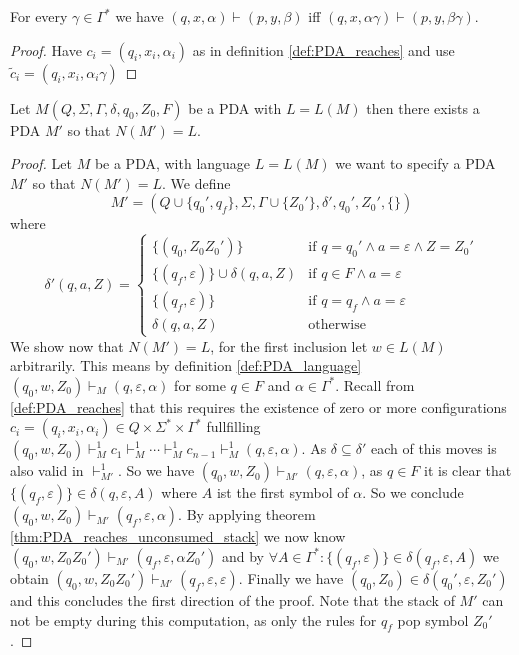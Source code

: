 \begin{theorem}\label{thm:PDA_reaches_unconsumed_stack}
  For   every $\gamma\in\Gamma^*$ we have $(q,x,\alpha)\vdash(p,y,\beta)$ iff
  $(q,x,\alpha\gamma)\vdash(p,y,\beta\gamma)$.
\end{theorem}
\begin{proof}
  Have $c_i = (q_i,x_i,\alpha_i)$ as in definition \ref{def:PDA_reaches} and use
  $\tilde{c}_i = (q_i,x_i,\alpha_i\gamma)$
\end{proof}
\begin{theorem}\label{thm:PDA_empty_stack_of_final_state}
  Let $M(Q,\Sigma,\Gamma,\delta,q_0,Z_0,F)$ be a PDA with $L=L(M)$ then there exists a PDA $M'$ so that $N(M')=L.$
\end{theorem}
\begin{proof}
  Let $M$ be a PDA, with language $L=L(M)$ we want to specify a PDA $M'$ so that
  $N(M')=L$. We define
  \[
  M' =(Q\cup\{q_0',q_f\},\Sigma,\Gamma\cup\{Z_0'\},\delta',q_0',Z_0',\{\})
  \]
  where
  \[
  \delta'(q,a,Z) =
  \begin{cases}
    \{(q_0,Z_0Z_0')\} & \text{if } q=q_0'\land a=\varepsilon \land Z=Z_0' \\
    \{(q_f,\varepsilon)\}\cup\delta(q,a,Z)  & \text{if } q\in F\land a=\varepsilon \\
    \{(q_f,\varepsilon)\} & \text{if } q=q_f \land a=\varepsilon \\
    \delta(q,a,Z) & \text{otherwise}
  \end{cases}
  \]
  We show now that $N(M')=L$, for the first inclusion let $w\in L(M)$ arbitrarily.
  This means by definition
  \ref{def:PDA_language} $(q_0,w,Z_0)\vdash_M(q,\varepsilon,\alpha)$ for some $q\in F$ and
  $\alpha\in\Gamma^*$. Recall from \ref{def:PDA_reaches} that this requires the existence
  of zero or more configurations $c_i=(q_i,x_i,\alpha_i)\in Q\times\Sigma^*\times\Gamma^*$
  fullfilling
  $(q_0,w,Z_0)\vdash^1_M c_1\vdash^1_M\cdots\vdash^1_M c_{n-1}\vdash^1_M(q,\varepsilon,\alpha)$.
  As $\delta\subseteq\delta'$ each of this moves is also valid in $\vdash^1_{M'}$.
  So we have $(q_0,w,Z_0)\vdash_{M'}(q,\varepsilon,\alpha)$, as $q\in F$ it is clear that
  $\{(q_f,\varepsilon)\}\in \delta(q,\varepsilon,A)$ where $A$ ist the first symbol of $\alpha$.
  So we conclude  $(q_0,w,Z_0)\vdash_{M'}(q_f,\varepsilon,\alpha)$.
  By applying theorem \ref{thm:PDA_reaches_unconsumed_stack} we now know
  $(q_0,w,Z_0Z_0')\vdash_{M'}(q_f,\varepsilon,\alpha Z_0')$
  and by $\forall A\in\Gamma^*:\{(q_f,\varepsilon)\}\in\delta(q_f,\varepsilon,A)$ we obtain
  $(q_0,w,Z_0Z_0')\vdash_{M'}(q_f,\varepsilon,\varepsilon)$. Finally we have
  $(q_0,Z_0)\in\delta(q_0',\varepsilon,Z_0')$ and this concludes the first direction of
  the proof. Note that the stack of $M'$ can not be empty during this computation, as only the rules
  for $q_f$ pop symbol $Z_0'$.



\end{proof}
